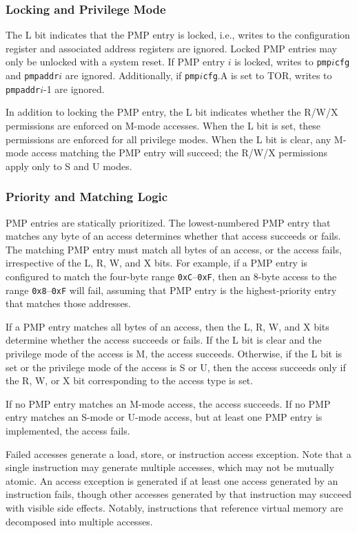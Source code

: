 \subsubsection*{Locking and Privilege Mode}

The L bit indicates that the PMP entry is locked, i.e., writes to the
configuration register and associated address registers are ignored.  Locked
PMP entries may only be unlocked with a system reset.  If PMP entry $i$ is
locked, writes to {\tt pmp}$i${\tt cfg} and {\tt pmpaddr}$i$ are ignored.
Additionally, if {\tt pmp}$i${\tt cfg}.A is set to TOR, writes to {\tt
pmpaddr}$i$-1 are ignored.

In addition to locking the PMP entry, the L bit indicates whether the R/W/X
permissions are enforced on M-mode accesses.  When the L bit is set, these
permissions are enforced for all privilege modes.  When the L bit is clear,
any M-mode access matching the PMP entry will succeed; the R/W/X
permissions apply only to S and U modes.

\subsubsection*{Priority and Matching Logic}

PMP entries are statically prioritized.  The lowest-numbered PMP entry that
matches any byte of an access determines whether that access succeeds or
fails.  The matching PMP entry must match all bytes of an access, or the
access fails, irrespective of the L, R, W, and X bits.  For example, if a PMP
entry is configured to match the four-byte range {\tt 0xC}--{\tt 0xF}, then an
8-byte access to the range {\tt 0x8}--{\tt 0xF} will fail, assuming that
PMP entry is the highest-priority entry that matches those addresses.

If a PMP entry matches all bytes of an access, then the L, R, W, and X bits
determine whether the access succeeds or fails.  If the L bit is clear and the
privilege mode of the access is M, the access succeeds.  Otherwise, if the
L bit is set or the privilege mode of the access is S or U, then the access
succeeds only if the R, W, or X bit corresponding to the access type is set.

If no PMP entry matches an M-mode access, the access succeeds.  If no PMP
entry matches an S-mode or U-mode access, but at least one PMP entry is
implemented, the access fails.

Failed accesses generate a load, store, or instruction access exception.  Note
that a single instruction may generate multiple accesses, which may not be
mutually atomic.  An access exception is generated if at least one access
generated by an instruction fails, though other accesses generated by that
instruction may succeed with visible side effects.  Notably, instructions that
reference virtual memory are decomposed into multiple accesses.


